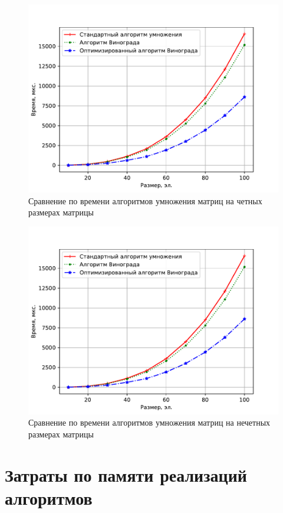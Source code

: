 \begin{figure}[H]
	\centering
	\includegraphics[height=0.4\textheight, page=1]{img/figures.pdf}
	\caption{Сравнение по времени алгоритмов умножения матриц на четных размерах матрицы}
	\label{plt:time_01}
\end{figure}

\begin{figure}[H]
	\centering
	\includegraphics[height=0.4\textheight, page=2]{img/figures.pdf}
	\caption{Сравнение по времени алгоритмов умножения матриц на нечетных размерах матрицы}
	\label{plt:time_02}
\end{figure}

\section{Затраты по памяти реализаций алгоритмов}

